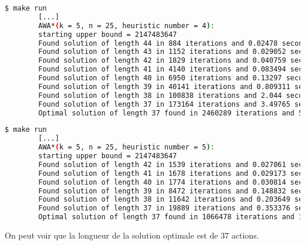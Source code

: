 \begin{minipage}{\dimexpr\linewidth-20pt}
    \begin{lstlisting}[language=bash, caption={Résultats de l'exécution du programme de recherche de plus court chemin avec l'heuristique $h_4$ et \textit{AWA*} pour $k = 5$ piles et $n = 25$ blocs.}, label={lst:plus_court_chemin_results_h4_k4_n20}]
        $ make run
        [...]
        AWA*(k = 5, n = 25, heuristic number = 4): 
        starting upper bound = 2147483647
        Found solution of length 44 in 884 iterations and 0.02478 seconds, upper bound = 44, weight = 2
        Found solution of length 43 in 1152 iterations and 0.029052 seconds, upper bound = 43, weight = 2
        Found solution of length 42 in 1829 iterations and 0.040759 seconds, upper bound = 42, weight = 2
        Found solution of length 41 in 4140 iterations and 0.083494 seconds, upper bound = 41, weight = 2
        Found solution of length 40 in 6950 iterations and 0.13297 seconds, upper bound = 40, weight = 2
        Found solution of length 39 in 40141 iterations and 0.809311 seconds, upper bound = 39, weight = 2
        Found solution of length 38 in 100838 iterations and 2.044 seconds, upper bound = 38, weight = 2
        Found solution of length 37 in 173164 iterations and 3.49765 seconds, upper bound = 37, weight = 2
        Optimal solution of length 37 found in 2460289 iterations and 51.5927 seconds, weight = 2
    \end{lstlisting}
\end{minipage}

\begin{minipage}{\dimexpr\linewidth-20pt}
    \begin{lstlisting}[language=bash, caption={Résultats de l'exécution du programme de recherche de plus court chemin avec l'heuristique $h_5$ et \textit{AWA*} pour $k = 5$ piles et $n = 25$ blocs.}, label={lst:plus_court_chemin_results_h4_k4_n20}]
        $ make run
        [...]
        AWA*(k = 5, n = 25, heuristic number = 5): 
        starting upper bound = 2147483647
        Found solution of length 42 in 1539 iterations and 0.027061 seconds, upper bound = 42, weight = 2
        Found solution of length 41 in 1678 iterations and 0.029173 seconds, upper bound = 41, weight = 2
        Found solution of length 40 in 1774 iterations and 0.030814 seconds, upper bound = 40, weight = 2
        Found solution of length 39 in 8472 iterations and 0.148832 seconds, upper bound = 39, weight = 2
        Found solution of length 38 in 11642 iterations and 0.203649 seconds, upper bound = 38, weight = 2
        Found solution of length 37 in 19889 iterations and 0.353376 seconds, upper bound = 37, weight = 2
        Optimal solution of length 37 found in 1066478 iterations and 19.9276 seconds, weight = 2
    \end{lstlisting}
\end{minipage}

On peut voir que la longueur de la solution optimale est de 37 actions.

